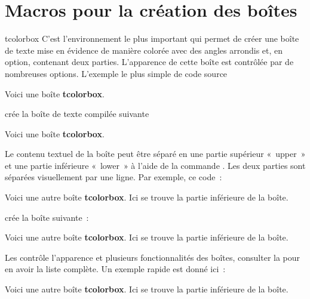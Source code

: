 \clearpage
\section{Macros pour la création des boîtes}%
%
\begin{docEnvironment}[doclang/environment content=Contenu de l'environnement]{tcolorbox}{}
  C'est l'environnement le plus important qui permet de créer une boîte de
  texte mise en évidence de manière colorée avec des angles arrondis et, en
  option, contenant deux parties. L'apparence de cette boîte est contrôlée
  par de nombreuses options. L'exemple le plus simple de code source

\begin{dispListing}
\begin{tcolorbox}
Voici une boîte \textbf{tcolorbox}.
\end{tcolorbox}
\end{dispListing}

crée la boîte de texte compilée suivante
\begin{tcolorbox}
Voici une boîte \textbf{tcolorbox}.
\end{tcolorbox}

Le contenu textuel de la boîte peut être séparé en une partie supérieur «~upper~» et une partie inférieure «~lower~» à l'aide de la commande  . Les deux parties sont séparées visuellement par une ligne. Par exemple, ce code~:
\begin{dispListing}
\begin{tcolorbox}
Voici une autre boîte \textbf{tcolorbox}.
\tcblower
Ici se trouve la partie inférieure de la boîte.
\end{tcolorbox}
\end{dispListing}
crée la boîte suivante~:

\begin{tcolorbox}
Voici une autre boîte \textbf{tcolorbox}.
\tcblower
Ici se trouve la partie inférieure de la boîte.
\end{tcolorbox}

Les  contrôle l'apparence et plusieurs fonctionnalités des boîtes,
consulter la  pour en avoir la liste complète.
Un exemple rapide est donné ici~:

\begin{dispExample}
\begin{tcolorbox}[colback=red!5!white,colframe=red!75!black,title=Mon bel en-tête]
Voici une autre boîte \textbf{tcolorbox}.
\tcblower
Ici se trouve la partie inférieure de la boîte.
\end{tcolorbox}
\end{dispExample}
\end{docEnvironment}

